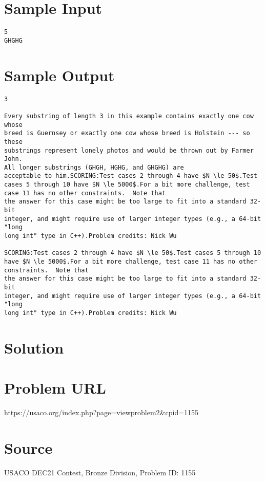 \documentclass[12pt]{article}
\begin{document}
\section*{Sample Input}
\begin{verbatim}
5
GHGHG
\end{verbatim}

\section*{Sample Output}
\begin{verbatim}
3

Every substring of length 3 in this example contains exactly one cow whose 
breed is Guernsey or exactly one cow whose breed is Holstein --- so these
substrings represent lonely photos and would be thrown out by Farmer John.  
All longer substrings (GHGH, HGHG, and GHGHG) are
acceptable to him.SCORING:Test cases 2 through 4 have $N \le 50$.Test cases 5 through 10 have $N \le 5000$.For a bit more challenge, test case 11 has no other constraints.  Note that
the answer for this case might be too large to fit into a standard 32-bit
integer, and might require use of larger integer types (e.g., a 64-bit "long
long int" type in C++).Problem credits: Nick Wu

SCORING:Test cases 2 through 4 have $N \le 50$.Test cases 5 through 10 have $N \le 5000$.For a bit more challenge, test case 11 has no other constraints.  Note that
the answer for this case might be too large to fit into a standard 32-bit
integer, and might require use of larger integer types (e.g., a 64-bit "long
long int" type in C++).Problem credits: Nick Wu
\end{verbatim}

\section*{Solution}


\section*{Problem URL}
https://usaco.org/index.php?page=viewproblem2&cpid=1155

\section*{Source}
USACO DEC21 Contest, Bronze Division, Problem ID: 1155
\end{document}
